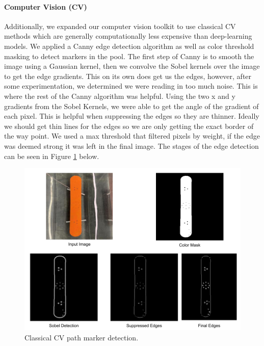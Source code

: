 \documentclass[conference]{IEEEtran}
\begin{document}
    
    
    \paragraph{Computer Vision (CV)}
    Additionally, we expanded our computer vision toolkit to use classical CV methods which are generally computationally less expensive than deep-learning models. We applied a Canny edge detection algorithm as well as color threshold masking to detect markers in the pool. The first step of Canny is to smooth the image using a Gaussian kernel, then we convolve the Sobel kernels over the image to get the edge gradients. This on its own does get us the edges, however, after some experimentation, we determined we were reading in too much noise. This is where the rest of the Canny algorithm was helpful. Using the two x and y gradients from the Sobel Kernels, we were able to get the angle of the gradient of each pixel. This is helpful when suppressing the edges so they are thinner. Ideally we should get thin lines for the edges so we are only getting the exact border of the way point. We used a max threshold that filtered pixels by weight, if the edge was deemed strong it was left in the final image. The stages of the edge detection can be seen in Figure \ref{fig:edgedetect} below.
    \begin{figure}[htbp]
    \centerline{\includegraphics[scale=0.25]{images/Way point Detection Figure.png}}
    \caption{Classical CV path marker detection.}
    \label{fig:edgedetect}
    \end{figure}
\end{document}
